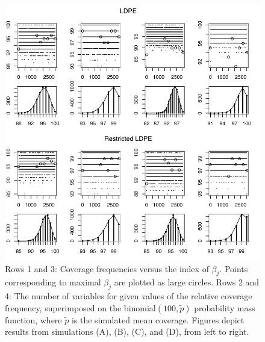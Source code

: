 \documentclass[11pt]{amsart}
\begin{document}
\begin{centering}
\begin{figure}%
\includegraphics{coverage.pdf}
\caption{Rows 1 and 3: Coverage frequencies versus the index of $\beta_j$. 
Points corresponding to maximal $\beta_j$ are plotted as large circles. 
Rows 2 and 4: The number %
of variables for given values of the relative coverage frequency, 
superimposed {on} the {binomial$(100,\tilde p)$} probability mass function, 
{where $\tilde p$ is the simulated mean coverage}. 
Figures depict results from simulations (A), (B), (C), and (D), from left to right.}
\label{fig:cover}
\end{figure}
\end{centering}
\end{document}
